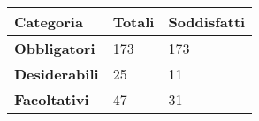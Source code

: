 \begin{center}
		\def\arraystretch{1.5}
		\bgroup
		\begin{longtable}{| p{8cm} | p{2cm} | p{2cm} |}
			\hline
			\textbf{Categoria} & \textbf{Totali} & \textbf{Soddisfatti} \\
			\hline
			\textbf{Obbligatori}  & 173 & 173 \\
			\hline
			\textbf{Desiderabili} & 25 & 11 \\
			\hline
			\textbf{Facoltativi} & 47 & 31 \\
			\hline
		\end{longtable}
		\egroup
	\end{center}
